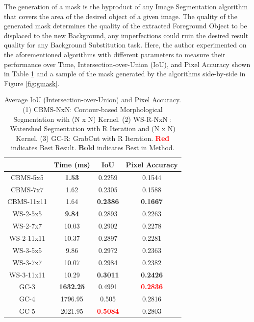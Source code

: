 \documentclass{article}
\begin{document}
The generation of a mask is the byproduct of any Image Segmentation algorithm that covers the area of the desired object of a given image. The quality of the generated mask determines the quality of the extracted Foreground Object to be displaced to the new Background, any imperfections could ruin the desired result quality for any Background Substitution task. Here, the author experimented on the aforementioned algorithms with different parameters to measure their performance over Time, Intersection-over-Union (IoU), and Pixel Accuracy shown in Table \ref{tab:maskg} and a sample of the mask generated by the algorithms side-by-side in Figure \ref{fig:gmask}.

\begin{table}
    \centering
    \begin{tabular}{|c|c|c|c|}
        \hline
         &  Time (ms) &  IoU&  Pixel Accuracy\\
         \hline
         CBMS-5x5   &  \textbf{1.53} &  0.2259  &  0.1544\\
         CBMS-7x7   &  1.62 &  0.2305  &  0.1588 \\
         CBMS-11x11 &  1.64 &  \textbf{0.2386}  &  \textbf{0.1667} \\
         \hline
         WS-2-5x5   &  \textbf{9.84} &  0.2893  &  0.2263\\
         WS-2-7x7   &  10.03 &  0.2902    &  0.2278\\
         WS-2-11x11 &  10.37 &  0.2897 &  0.2281 \\
         WS-3-5x5   &  9.86 &  0.2972   &  0.2363  \\
         WS-3-7x7   &  10.07 &  0.2984   &  0.2382 \\
         WS-3-11x11 &  10.29 &  \textbf{0.3011}  &  \textbf{0.2426} \\
         \hline
         GC-3   &  \textbf{1632.25} &  0.4991 &  \textcolor{red}{\textbf{0.2836}}  \\
         GC-4   &  1796.95 &  0.505  &  0.2816 \\
         GC-5   &  2021.95 &  \textcolor{red}{\textbf{0.5084}}  & 0.2803 \\
         \hline
    \end{tabular}
    \caption{Average IoU (Intersection-over-Union) and Pixel Accuracy. (1) CBMS-NxN: Contour-based Morphological Segmentation with (N x N) Kernel. (2) WS-R-NxN : Watershed Segmentation with R Iteration and (N x N) Kernel. (3) GC-R: GrabCut with R Iteration. \textcolor{red}{\textbf{Red}} indicates Best Result. \textbf{Bold} indicates Best in Method.}
    \label{tab:maskg}
\end{table}
\end{document}
